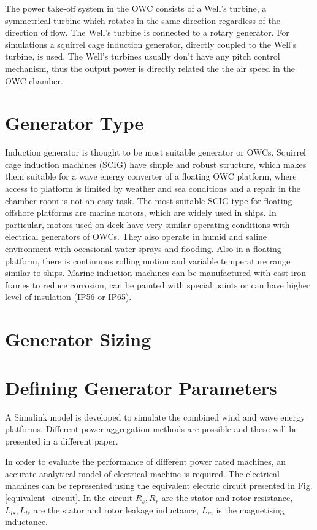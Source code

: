 \documentclass[twocolumn]{article}
\begin{document}
The power take-off system in the OWC consists of a Well's turbine, a symmetrical turbine which rotates in the same direction regardless of the direction of flow. The Well's turbine is connected to a rotary generator. For simulations a squirrel cage induction generator, directly coupled to the Well's turbine, is used. The Well's turbines usually don't have any pitch control mechanism, thus the output power is directly related the the air speed in the OWC chamber.


\section{Generator Type}

Induction generator is thought to be most suitable generator or OWCs. Squirrel cage induction machines (SCIG) have simple and robust structure, which makes them suitable for a wave energy converter of a floating OWC platform, where access to platform is limited by weather and sea conditions and a repair in the chamber room is not an easy task. 
The most suitable SCIG type for floating offshore platforms are marine motors, which are widely used in ships. In particular, motors used on deck have very similar operating conditions with electrical generators of OWCs. They also operate in humid and saline environment with occasional water sprays and flooding. Also in a floating platform, there is continuous rolling motion and variable temperature range similar to ships. Marine induction machines can be manufactured  with cast iron frames to reduce corrosion, can be painted with special paints or can have higher level of insulation (IP56 or IP65). 

\section{Generator Sizing}

\section{Defining Generator Parameters}

A Simulink model is developed to simulate the combined wind and wave energy platforms. Different power aggregation methods are possible and these will be presented in a different paper.

In order to evaluate the performance of different power rated machines, an accurate analytical model of electrical machine is required. The electrical machines can be represented using the equivalent electric circuit presented in Fig. \ref{equivalent_circuit}. In the circuit $R_s, R_r$ are the stator and rotor resistance, $L_{ls}, L_{lr}$ are the stator and rotor leakage inductance, $L_m$ is the magnetising inductance.
\end{document}
